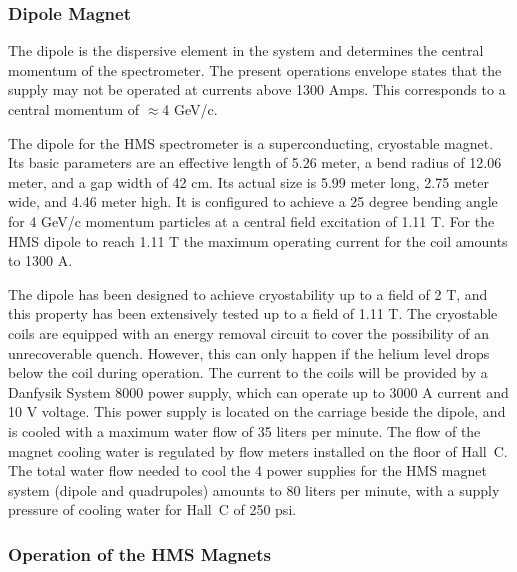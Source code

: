 \vspace{0.5in}
\hspace*{3.5in}{\underline{~~~~~~~~~~~~~~~~~~~~~~~~~~~~~~~~~}}
\newline
\hspace*{3.5in}{Signature~~~~~~~~~~~~Date}

\newpage
\subsubsection{Dipole Magnet }

The dipole is the dispersive element in the system and 
determines the central momentum of the spectrometer.
The present operations envelope states that the supply may not be
operated at currents above 1300 Amps. This corresponds to a central
momentum of $\approx$4 GeV/c.

The dipole for the HMS spectrometer is a superconducting, cryostable magnet.
Its basic parameters are an effective length of 5.26 meter,
a bend radius of 12.06 meter, and a gap width of 42 cm.
Its actual size is 5.99 meter long, 2.75 meter wide, and 4.46 meter high.
It is configured to achieve a 25 degree bending angle for 4 GeV/c momentum
particles at a central field excitation of 1.11 T.
For the HMS dipole to reach 1.11 T the maximum operating current for the coil
amounts to 1300 A.

The dipole has been designed to achieve cryostability up to a field of 2 T,
and this property has been extensively tested up to a field of 1.11 T.
The cryostable coils are equipped with an energy removal circuit to cover
the possibility of an unrecoverable quench. \cite{bi:hms2}
However, this can only happen
if the helium level drops below the coil during operation.
The current to the coils will be provided by a Danfysik System 8000 power
supply, which can operate up to 3000 A current and 10 V voltage.
This power supply is located on the carriage beside the dipole, and
is cooled with a maximum water flow of 35 liters per minute.
The flow of the magnet cooling water is regulated by flow meters installed
on the floor of Hall~C. The total water flow needed to cool the 4 power
supplies for the HMS magnet system (dipole and quadrupoles) amounts
to 80 liters per minute, with a supply pressure of cooling water for
Hall~C of 250 psi.


\subsubsection{Operation of the HMS Magnets}

